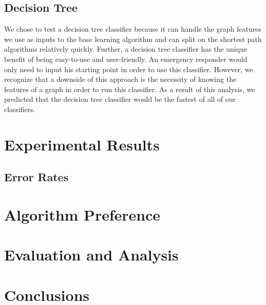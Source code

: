 \documentclass{article}
\begin{document}
\subsection{Decision Tree}

We chose to test a decision tree classifier because it can handle the graph features we use as inputs to the base learning algorithm and can split on the shortest path algorithms relatively quickly. Further, a decision tree classifier has the unique benefit of being easy-to-use and user-friendly. An emergency responder would only need to input his starting point in order to use this classifier. However, we recognize that a downside of this approach is the necessity of knowing the features of a graph in order to run this classifier. As a result of this analysis, we predicted that the decision tree classifier would be the fastest of all of our classifiers.

\section{Experimental Results}

\subsection{Error Rates}

\section{Algorithm Preference}

\section{Evaluation and Analysis}

\section{Conclusions}



\end{document}
